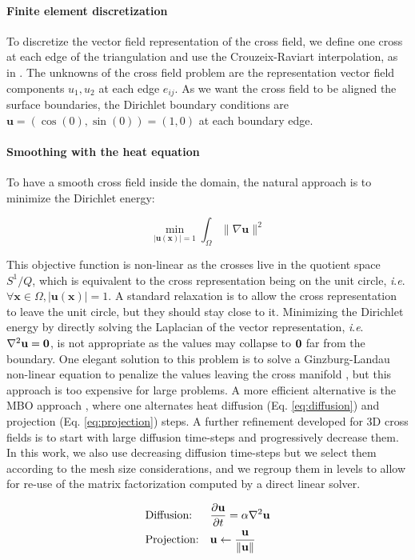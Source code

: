 \documentclass[AMA,STIX1COL]{WileyNJD-v2}
\newcommand{\vx}{\ensuremath{\mathbf{x}}}
\newcommand{\vu}{\ensuremath{\mathbf{u}}}
\newcommand{\ie}{\textit{i}.\textit{e}. }
\begin{document}
{\paragraph{Finite element discretization}
To discretize the vector field representation of the cross field, we define one
cross at each edge of the triangulation and use the Crouzeix-Raviart
interpolation, as in \cite{beaufort2017}. The unknowns of the cross field problem are the representation
vector field components $u_1,u_2$ at each edge $e_{ij}$. As we want the
cross field to be aligned the surface boundaries, the Dirichlet boundary
conditions are $\vu = (\cos(0),\sin(0))=(1,0)$ at each boundary edge.

\paragraph{Smoothing with the heat equation}

To have a smooth cross field inside the domain, the natural approach is to minimize
the Dirichlet energy: 

$$ \min_{|\vu(\vx)|=1} \int_\Omega \| \nabla \vu \|^2$$

This objective function is non-linear as the crosses live in
the quotient space $S^1/Q$, which is equivalent to the cross
representation being on the unit circle, \ie $\forall \vx \in \Omega, |\vu(\vx)|=1$.
A standard relaxation is to allow the cross representation to leave the unit circle,
but they should stay close to it. Minimizing the Dirichlet energy by directly solving the Laplacian
of the vector representation, \ie $\nabla^2 \vu = {\bf 0}$, is not appropriate
as the values may collapse to ${\bf 0}$ far from the boundary.
One elegant solution to this problem is to
solve a Ginzburg-Landau non-linear equation to penalize the values leaving the
cross manifold \cite{beaufort2017}, but this approach is too expensive for large
problems. A more efficient alternative is the MBO approach \cite{viertel2019},
where one alternates heat diffusion (Eq. \ref{eq:diffusion}) and projection (Eq. \ref{eq:projection}) steps. A further refinement
\cite{palmer2020} developed for 3D cross fields is to start with large diffusion
time-steps and progressively decrease them. In this work, we also use
decreasing diffusion time-steps but we select them according to the mesh size
considerations, and we regroup them in levels to allow for re-use of the matrix
factorization computed by a direct linear solver.  

\begin{align}
    &\text{Diffusion:} &&{\partial \vu \over \partial t} = \alpha \nabla^2 \vu \label{eq:diffusion} \\
    &\text{Projection:} &&\vu \leftarrow \frac{\vu}{\| \vu \|}  \label{eq:projection}
\end{align}

}
\end{document}

